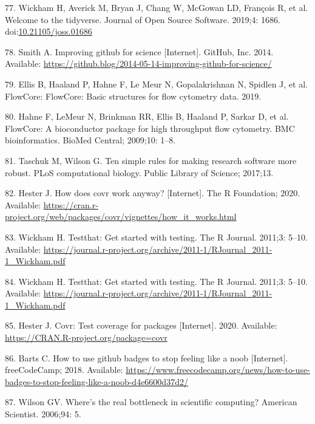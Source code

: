\documentclass[10pt,letterpaper]{article}
\begin{document}
\leavevmode\hypertarget{ref-tidyverse}{}%
77. Wickham H, Averick M, Bryan J, Chang W, McGowan LD, François R, et
al. Welcome to the tidyverse. Journal of Open Source Software. 2019;4:
1686.
doi:\href{https://doi.org/10.21105/joss.01686}{10.21105/joss.01686}

\leavevmode\hypertarget{ref-smith2014}{}%
78. Smith A. Improving github for science {[}Internet{]}. GitHub, Inc.
2014. Available:
\url{https://github.blog/2014-05-14-improving-github-for-science/}

\leavevmode\hypertarget{ref-flowCore}{}%
79. Ellis B, Haaland P, Hahne F, Le Meur N, Gopalakrishnan N, Spidlen J,
et al. FlowCore: FlowCore: Basic structures for flow cytometry data.
2019.

\leavevmode\hypertarget{ref-hahne2009}{}%
80. Hahne F, LeMeur N, Brinkman RR, Ellis B, Haaland P, Sarkar D, et al.
FlowCore: A bioconductor package for high throughput flow cytometry. BMC
bioinformatics. BioMed Central; 2009;10: 1--8.

\leavevmode\hypertarget{ref-taschuk2017}{}%
81. Taschuk M, Wilson G. Ten simple rules for making research software
more robust. PLoS computational biology. Public Library of Science;
2017;13.

\leavevmode\hypertarget{ref-hester2020}{}%
82. Hester J. How does covr work anyway? {[}Internet{]}. The R
Foundation; 2020. Available:
\url{https://cran.r-project.org/web/packages/covr/vignettes/how_it_works.html}

\leavevmode\hypertarget{ref-wickham2011}{}%
83. Wickham H. Testthat: Get started with testing. The R Journal.
2011;3: 5--10. Available:
\url{https://journal.r-project.org/archive/2011-1/RJournal_2011-1_Wickham.pdf}

\leavevmode\hypertarget{ref-testthat}{}%
84. Wickham H. Testthat: Get started with testing. The R Journal.
2011;3: 5--10. Available:
\url{https://journal.r-project.org/archive/2011-1/RJournal_2011-1_Wickham.pdf}

\leavevmode\hypertarget{ref-covr}{}%
85. Hester J. Covr: Test coverage for packages {[}Internet{]}. 2020.
Available: \url{https://CRAN.R-project.org/package=covr}

\leavevmode\hypertarget{ref-barts2018}{}%
86. Barts C. How to use github badges to stop feeling like a noob
{[}Internet{]}. freeCodeCamp; 2018. Available:
\url{https://www.freecodecamp.org/news/how-to-use-badges-to-stop-feeling-like-a-noob-d4e6600d37d2/}

\leavevmode\hypertarget{ref-wilson2006}{}%
87. Wilson GV. Where's the real bottleneck in scientific computing?
American Scientist. 2006;94: 5.
\end{document}
